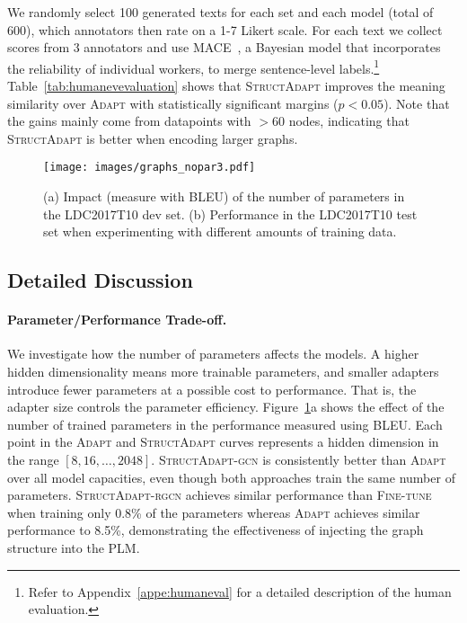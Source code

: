 \documentclass[11pt]{article}
\newcommand{\graphadapter}{{\small\textsc{StructAdapt}}\xspace}
\newcommand{\graphadaptergcn}{{\small\textsc{StructAdapt-gcn}}\xspace}
\newcommand{\graphadapterrgcn}{{\small\textsc{StructAdapt-rgcn}}\xspace}
\newcommand{\vanilladapter}{{\small\textsc{Adapt}}\xspace}
\newcommand{\finetune}{{\small\textsc{Fine-tune}}\xspace}
\begin{document}
We randomly select 100 generated texts for each set and each model (total of 600), which annotators then rate on a 1-7 Likert scale. For each text we collect scores from 3 annotators and use MACE~\cite{hovy-etal-2013-learning}, a Bayesian model that incorporates the reliability of individual workers, to merge sentence-level labels.\footnote{Refer to Appendix~\ref{appe:humaneval} for a detailed description of the human evaluation.} Table~\ref{tab:humanevevaluation} shows that \graphadapter improves the meaning similarity over \vanilladapter with statistically significant margins ($p{<}0.05$). Note that the gains mainly come from datapoints with ${>}60$ nodes, indicating that \graphadapter is better when encoding larger graphs.



\begin{figure}[t]
\texttt{[image: images/graphs\_nopar3.pdf]}
    \caption{(a) Impact (measure with BLEU) of the number of parameters in the LDC2017T10 dev set. (b) Performance in the LDC2017T10 test set when experimenting with different amounts of training data.}
    \label{fig:hidden}
\end{figure}

\subsection{Detailed Discussion}

\paragraph{Parameter/Performance Trade-off.}

We investigate how the number of parameters affects the models. A higher hidden dimensionality means more trainable parameters, and smaller adapters introduce fewer parameters at a possible cost to performance. That is, the adapter size controls the parameter efficiency. Figure~\ref{fig:hidden}a shows the effect of the number of trained parameters in the performance measured using BLEU. Each point in the \vanilladapter and \graphadapter curves represents a hidden dimension in the range $[8, 16, \ldots, 2048]$. \graphadaptergcn is consistently better than \vanilladapter over all model capacities, even though both approaches train the same number of parameters. \graphadapterrgcn achieves similar performance than \finetune when training only 0.8\% of the parameters whereas \vanilladapter achieves similar performance to 8.5\%, demonstrating the effectiveness of injecting the graph structure into the PLM.
\end{document}
